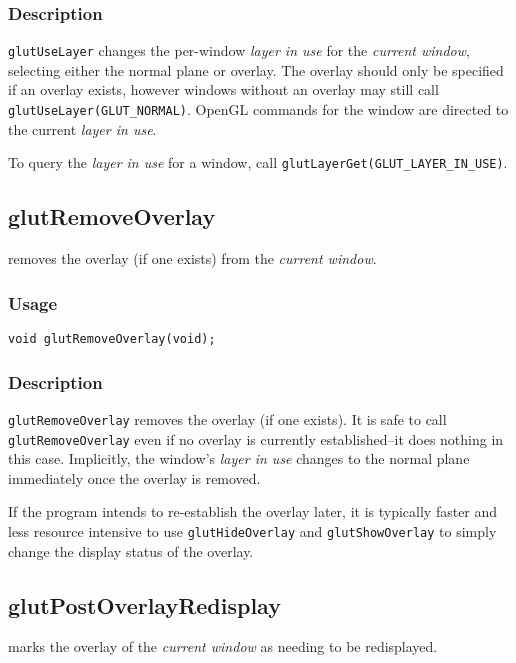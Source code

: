 \subsubsection*{Description}

{\tt glutUseLayer} changes the per-window {\em layer in use} for the
{\em current window}, selecting either the normal plane or overlay.
The overlay should only be specified if an overlay exists, however
windows without an overlay may still call {\tt
glutUseLayer(GLUT\_NORMAL)}.  OpenGL commands for the window are
directed to the current {\em layer in use}.

To query the {\em layer in use} for a window, call {\tt glutLayerGet(GLUT\_LAYER\_IN\_USE)}.

\subsection{glutRemoveOverlay}

 removes the overlay (if one exists) from
the {\em current window}.

\subsubsection*{Usage}

\begin{verbatim}
void glutRemoveOverlay(void);
\end{verbatim}

\subsubsection*{Description}

{\tt glutRemoveOverlay} removes the overlay (if one exists).  It is
safe to call {\tt glutRemoveOverlay} even if no overlay is currently
established--it does nothing in this case.  Implicitly, the window's
{\em layer in use} changes to the normal plane immediately once the
overlay is removed.

If the program intends to re-establish the overlay later, it is
typically faster and less resource intensive to use {\tt glutHideOverlay}
and {\tt glutShowOverlay} to simply change the display status of the
overlay.

\subsection{glutPostOverlayRedisplay}

 marks the overlay of the {\em current
window} as needing to be redisplayed.

